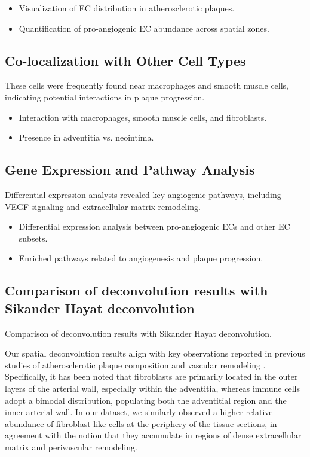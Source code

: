 \documentclass[a4paper,12pt]{article}
\begin{document}
\begin{itemize}
  \item Visualization of EC distribution in atherosclerotic plaques.
  \item Quantification of pro-angiogenic EC abundance across spatial zones.
\end{itemize}

\subsection{Co-localization with Other Cell Types}
These cells were frequently found near macrophages and smooth muscle cells, indicating potential interactions in plaque progression.

\begin{itemize}
  \item Interaction with macrophages, smooth muscle cells, and fibroblasts.
  \item Presence in adventitia vs. neointima.
\end{itemize}

\subsection{Gene Expression and Pathway Analysis}
Differential expression analysis revealed key angiogenic pathways, including VEGF signaling and extracellular matrix remodeling.

\begin{itemize}
  \item Differential expression analysis between pro-angiogenic ECs and other EC subsets.
  \item Enriched pathways related to angiogenesis and plaque progression.
\end{itemize}

\subsection{Comparison of deconvolution results with Sikander Hayat deconvolution}
Comparison of deconvolution results with Sikander Hayat deconvolution.

Our spatial deconvolution results align with key observations reported in previous studies of atherosclerotic plaque composition and vascular remodeling \citep{Bleckwehl2025-td}. Specifically, it has been noted that fibroblasts are primarily located in the outer layers of the arterial wall, especially within the adventitia, whereas immune cells adopt a bimodal distribution, populating both the adventitial region and the inner arterial wall. In our dataset, we similarly observed a higher relative abundance of fibroblast-like cells at the periphery of the tissue sections, in agreement with the notion that they accumulate in regions of dense extracellular matrix and perivascular remodeling. 
\end{document}
